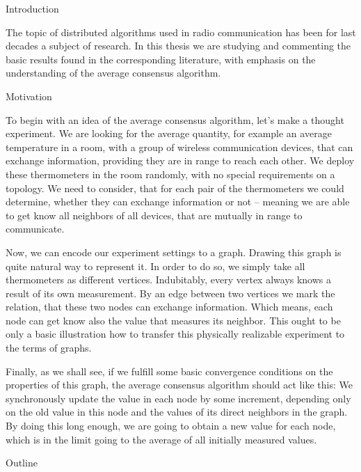
\def\ctustyle{{\tenss CTUstyle}}
\def\ttb{\tt\char'\\} %

\chap Introduction

The topic of distributed algorithms used in radio communication has been for last decades a subject of research. In this thesis we are studying  and commenting the basic results found in the corresponding literature, with emphasis on the understanding of the average consensus algorithm.

\sec Motivation

To begin with an idea of the average consensus algorithm, let's make a thought experiment. We are looking for the average quantity, for example an average temperature in a room, with a group of wireless communication devices, that can exchange information, providing they are in range to reach each other. We deploy these thermometers in the room randomly, with no special requirements on a topology. We need to consider, that for each pair of the thermometers we could determine, whether they can exchange information or not -- meaning we are able to get know all neighbors of all devices, that are mutually in range to communicate.

Now, we can encode our experiment settings to a graph. Drawing this graph is  quite natural way to represent it. In order to do so, we simply take all thermometers as different vertices. Indubitably, every vertex always knows a result of its own measurement. By an edge between two vertices we mark the relation, that these two nodes can exchange information. Which means, each node can get know also the value that measures its neighbor. This ought to be only a basic illustration how to transfer this physically realizable experiment to the terms of graphs.

Finally, as we shall see, if we fulfill some basic convergence conditions on the properties of this graph, the average consensus algorithm should act like this: We synchronously update the value in each node by some increment, depending only on the old value in this node and the values of its direct neighbors in the graph. By doing this long enough, we are going to obtain a new value for each node, which is in the limit going to the average of all initially measured values.

\sec Outline


